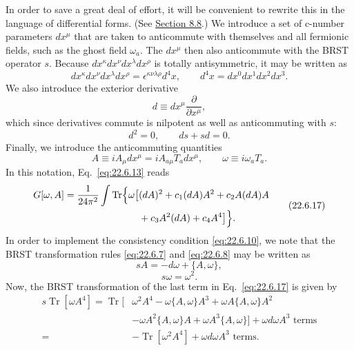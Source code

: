 In order to save a great deal of effort, it will be convenient to rewrite
this in the language of differential forms. (See
\hyperref[sec:8.8]{Section 8.8}.) We introduce a set of c-number parameters
$dx^\mu$ that are taken to anticommute with themselves and all fermionic
fields, such as the ghost field $\omega_a$. The $dx^\mu$ then also
anticommute with the BRST operator $s$. Because
$dx^\kappa dx^\nu dx^\lambda dx^\rho$ is totally antisymmetric, it may be
written as
\begin{equation}
 dx^\kappa dx^\nu dx^\lambda dx^\rho
 =\epsilon^{\kappa\nu\lambda\rho}d^4x,
 \qquad
 d^4x=dx^0dx^1dx^2dx^3.
 \tag{22.6.14}\label{eq:22.6.14}
\end{equation}
We also introduce the exterior derivative
\[
 d\equiv dx^\mu\frac{\partial}{\partial x^\mu},
\]
which since derivatives commute is nilpotent as well as anticommuting
with $s$:
\begin{equation}
 d^2=0,
 \qquad
 ds+sd=0.
 \tag{22.6.15}\label{eq:22.6.15}
\end{equation}
Finally, we introduce the anticommuting quantities
\begin{equation}
 A\equiv iA_\mu dx^\mu
 =iA_{a\mu}T_a dx^\mu,
 \qquad
 \omega\equiv i\omega_a T_a.
 \tag{22.6.16}\label{eq:22.6.16}
\end{equation}
In this notation, Eq.~\eqref{eq:22.6.13} reads
\begin{equation}
 \begin{aligned}
 G[\omega,A]
 =\frac{1}{24\pi^2}\int\operatorname{Tr}\Bigl\{
 \omega\bigl[
 &(dA)^2+c_1(dA)A^2+c_2A(dA)A
 \\
 &+c_3A^2(dA)+c_4A^4
 \bigr]\Bigr\}.
 \end{aligned}
 \tag{22.6.17}\label{eq:22.6.17}
\end{equation}
In order to implement the consistency condition \eqref{eq:22.6.10}, we
note that the BRST transformation rules \eqref{eq:22.6.7} and
\eqref{eq:22.6.8} may be written as
\begin{equation}
 sA=-d\omega+\{A,\omega\},
 \tag{22.6.18}\label{eq:22.6.18}
\end{equation}
\begin{equation}
 s\omega=\omega^2.
 \tag{22.6.19}\label{eq:22.6.19}
\end{equation}
Now, the BRST transformation of the last term in Eq.~\eqref{eq:22.6.17}
is given by
\[
 \begin{aligned}
 s\operatorname{Tr}[\omega A^4]
 =\operatorname{Tr}\bigl[
 &\omega^2A^4-\omega\{A,\omega\}A^3
 +\omega A\{A,\omega\}A^2
 \\
 &-\omega A^2\{A,\omega\}A
 +\omega A^3\{A,\omega\}
 \bigr]
 +\text{$\omega d\omega A^3$ terms}
 \\
 ={}&-\operatorname{Tr}[\omega^2A^4]
 +\text{$\omega d\omega A^3$ terms}.
 \end{aligned}
\]
